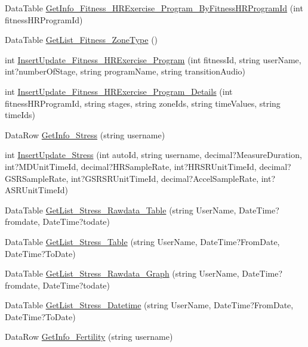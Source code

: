 \begin{DoxyCompactItemize}
\item 
Data\-Table \hyperlink{class_d_b_class_a5be81c16e8893940b65e6cd7492d0517}{Get\-Info\-\_\-\-Fitness\-\_\-\-H\-R\-Exercise\-\_\-\-Program\-\_\-\-By\-Fitness\-H\-R\-Program\-Id} (int fitness\-H\-R\-Program\-Id)
\item 
Data\-Table \hyperlink{class_d_b_class_a7a5f310fffc8ab3a20bd33ac6e4312b6}{Get\-List\-\_\-\-Fitness\-\_\-\-Zone\-Type} ()
\item 
int \hyperlink{class_d_b_class_a2011973f0271030aa62150f5289d476f}{Insert\-Update\-\_\-\-Fitness\-\_\-\-H\-R\-Exercise\-\_\-\-Program} (int fitness\-Id, string user\-Name, int?number\-Of\-Stage, string program\-Name, string transition\-Audio)
\item 
int \hyperlink{class_d_b_class_a779173f60fc7e7d810f6c131f5d06896}{Insert\-Update\-\_\-\-Fitness\-\_\-\-H\-R\-Exercise\-\_\-\-Program\-\_\-\-Details} (int fitness\-H\-R\-Program\-Id, string stages, string zone\-Ids, string time\-Values, string time\-Ids)
\item 
Data\-Row \hyperlink{class_d_b_class_acf04cf47637571f88a6070d17e7ecd9d}{Get\-Info\-\_\-\-Stress} (string username)
\item 
int \hyperlink{class_d_b_class_adc8d1ca8c834e65325767f8187caf996}{Insert\-Update\-\_\-\-Stress} (int auto\-Id, string username, decimal?Measure\-Duration, int?M\-D\-Unit\-Time\-Id, decimal?H\-R\-Sample\-Rate, int?H\-R\-S\-R\-Unit\-Time\-Id, decimal?G\-S\-R\-Sample\-Rate, int?G\-S\-R\-S\-R\-Unit\-Time\-Id, decimal?Accel\-Sample\-Rate, int?A\-S\-R\-Unit\-Time\-Id)
\item 
Data\-Table \hyperlink{class_d_b_class_ad7d82013b592fb68b018a7a3a13f288a}{Get\-List\-\_\-\-Stress\-\_\-\-Rawdata\-\_\-\-Table} (string User\-Name, Date\-Time?fromdate, Date\-Time?todate)
\item 
Data\-Table \hyperlink{class_d_b_class_ae17050a8d003121b52345fca852c79ac}{Get\-List\-\_\-\-Stress\-\_\-\-Table} (string User\-Name, Date\-Time?From\-Date, Date\-Time?To\-Date)
\item 
Data\-Table \hyperlink{class_d_b_class_a197e91d6f8a237667be07dfa2bed6f43}{Get\-List\-\_\-\-Stress\-\_\-\-Rawdata\-\_\-\-Graph} (string User\-Name, Date\-Time?fromdate, Date\-Time?todate)
\item 
Data\-Table \hyperlink{class_d_b_class_a1795f539e4d1d2026a81813aa941729f}{Get\-List\-\_\-\-Stress\-\_\-\-Datetime} (string User\-Name, Date\-Time?From\-Date, Date\-Time?To\-Date)
\item 
Data\-Row \hyperlink{class_d_b_class_a5facb048821017872ad28def8ed62069}{Get\-Info\-\_\-\-Fertility} (string username)

\end{DoxyCompactItemize}
